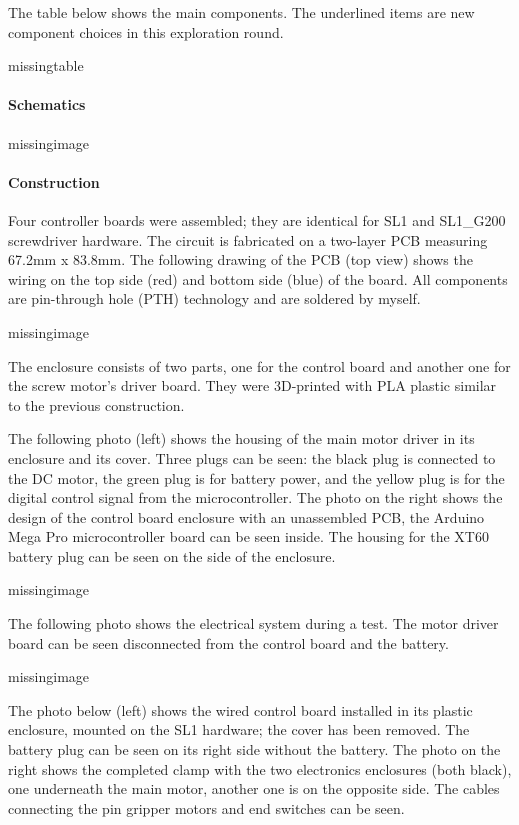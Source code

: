 The table below shows the main components. The underlined items are new component choices in this exploration round. 

missingtable

\paragraph{Schematics}

missingimage

\paragraph{Construction}
Four controller boards were assembled; they are identical for SL1 and SL1\_G200 screwdriver hardware. The circuit is fabricated on a two-layer PCB measuring 67.2mm x 83.8mm. The following drawing of the PCB (top view) shows the wiring on the top side (red) and bottom side (blue) of the board. All components are pin-through hole (PTH) technology and are soldered by myself.

missingimage

The enclosure consists of two parts, one for the control board and another one for the screw motor’s driver board. They were 3D-printed with PLA plastic similar to the previous construction. 

The following photo (left) shows the housing of the main motor driver in its enclosure and its cover. Three plugs can be seen: the black plug is connected to the DC motor, the green plug is for battery power, and the yellow plug is for the digital control signal from the microcontroller. The photo on the right shows the design of the control board enclosure with an unassembled PCB, the Arduino Mega Pro microcontroller board can be seen inside. The housing for the XT60 battery plug can be seen on the side of the enclosure. 

missingimage

The following photo shows the electrical system during a test. The motor driver board can be seen disconnected from the control board and the battery.

missingimage

The photo below (left) shows the wired control board installed in its plastic enclosure, mounted on the SL1 hardware; the cover has been removed. The battery plug can be seen on its right side without the battery. The photo on the right shows the completed clamp with the two electronics enclosures (both black), one underneath the main motor, another one is on the opposite side. The cables connecting the pin gripper motors and end switches can be seen.

